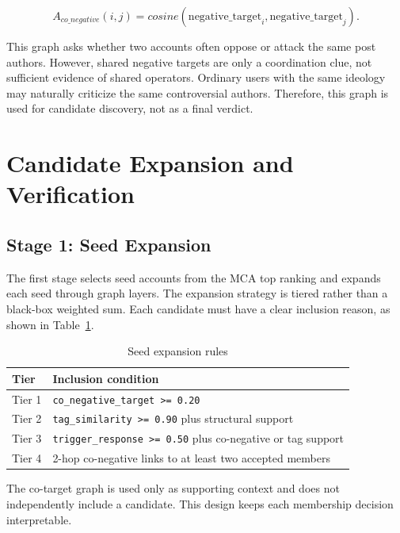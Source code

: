 \documentclass[conference]{IEEEtran}
\begin{document}
\begin{equation}
A_{co\_negative}(i,j)=cosine(\mathrm{negative\_target}_i, \mathrm{negative\_target}_j).
\end{equation}

This graph asks whether two accounts often oppose or attack the same post authors. However, shared negative targets are only a coordination clue, not sufficient evidence of shared operators. Ordinary users with the same ideology may naturally criticize the same controversial authors. Therefore, this graph is used for candidate discovery, not as a final verdict.

\section{Candidate Expansion and Verification}

\subsection{Stage 1: Seed Expansion}

The first stage selects seed accounts from the MCA top ranking and expands each seed through graph layers. The expansion strategy is tiered rather than a black-box weighted sum. Each candidate must have a clear inclusion reason, as shown in Table~\ref{tab:tiers-en}.

\begin{table}[htbp]
\centering
\caption{Seed expansion rules}
\label{tab:tiers-en}
\small
\begin{tabular}{p{}p{}}
\toprule
Tier & Inclusion condition \\
\midrule
Tier 1 & \texttt{co\_negative\_target >= 0.20} \\
Tier 2 & \texttt{tag\_similarity >= 0.90} plus structural support \\
Tier 3 & \texttt{trigger\_response >= 0.50} plus co-negative or tag support \\
Tier 4 & 2-hop co-negative links to at least two accepted members \\
\bottomrule
\end{tabular}
\end{table}

The co-target graph is used only as supporting context and does not independently include a candidate. This design keeps each membership decision interpretable.
\end{document}
